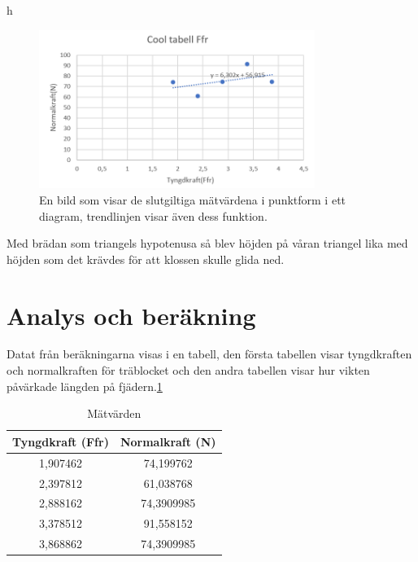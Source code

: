 h\documentclass[11p, titlepage, oneside, a4paper]{article}
\begin{document}
        \begin{figure}[!h]
            \includegraphics[width=0.8\textwidth]{images/tabell fysik labb2.PNG}
            \caption{En bild som visar de slutgiltiga mätvärdena i punktform i ett diagram, trendlinjen visar även dess funktion.}
            \label{fig:lutandeplan}
        \end{figure}
        
        Med brädan som triangels hypotenusa så blev höjden på våran triangel lika med höjden som det krävdes för att klossen skulle glida ned.
    \newpage
	\section{Analys och beräkning}
        Datat från beräkningarna visas i en tabell, den första tabellen visar tyngdkraften och normalkraften för träblocket
        och den andra tabellen visar hur vikten påvärkade längden på fjädern.\ref{table:result}



        \begin{table}
            \begin{center}
            \begin{tabular}{ |c|c| } 
                \hline
                Tyngdkraft (Ffr) & Normalkraft (N)  \\
                \hline
                1,907462 & 74,199762 \\
                2,397812 & 61,038768 \\
                2,888162 & 74,3909985 \\
                3,378512 & 91,558152 \\
                3,868862 & 74,3909985 \\

                \hline
            \end{tabular}
                \caption{Mätvärden}
                \label{table:result}
            \end{center}
        \end{table}
\end{document}
